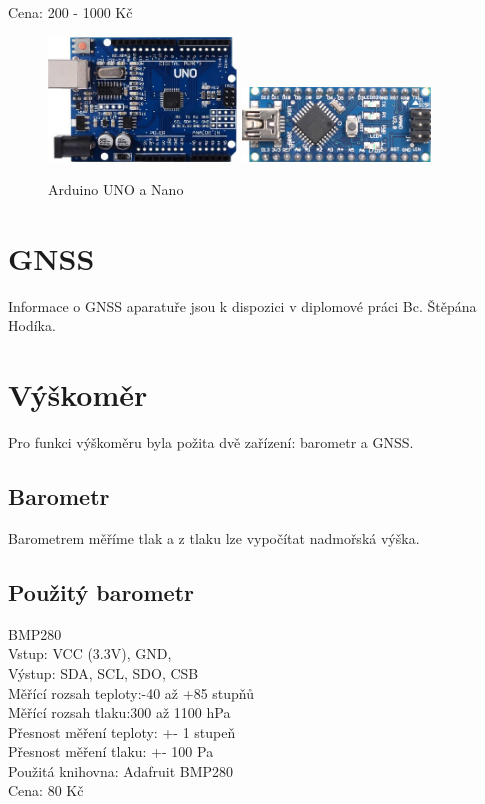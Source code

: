 Cena: 200 - 1000 Kč\\

\begin{figure}
	\centering
	\includegraphics[width=5cm]{pictures/uno.jpg}
	\includegraphics[width=5cm]{pictures/nano.jpg}
	\caption{Arduino UNO a Nano}
\end{figure}

\section{GNSS}
Informace o GNSS aparatuře jsou k dispozici v diplomové práci Bc. Štěpána Hodíka.

\section{Výškoměr}
Pro funkci výškoměru byla požita dvě zařízení: barometr a GNSS.

\subsection{Barometr}
Barometrem měříme tlak a z tlaku lze vypočítat nadmořská výška.

\subsection{Použitý barometr}
BMP280\\
Vstup: VCC (3.3V), GND,\\
Výstup: SDA, SCL, SDO, CSB\\
Měřící rozsah teploty:-40 až +85 stupňů\\
Měřící rozsah tlaku:300 až 1100 hPa\\
Přesnost měření teploty: +- 1 stupeň\\
Přesnost měření tlaku:  +- 100 Pa\\
Použitá knihovna: Adafruit BMP280\\
Cena: 80 Kč\\

